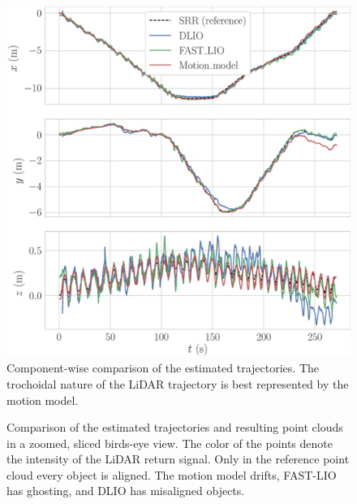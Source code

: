 \begin{figure}
  \centering 
  \includegraphics[width=\linewidth]{img/trajectory_components}
  \caption{Component-wise comparison of the estimated trajectories.
  The trochoidal nature of the LiDAR trajectory is best represented by the motion model.}
  \label{fig:components}
\end{figure}

\begin{figure}
  \centering 
  \hfill \vskip 2mm 
  \hfill
  \caption{Comparison of the estimated trajectories and resulting point clouds in a zoomed, sliced birds-eye view.
  The color of the points denote the intensity of the LiDAR return signal.
  Only in the reference point cloud every object is aligned.
  The motion model drifts, FAST-LIO has ghosting, and DLIO has misaligned objects.}
  \label{fig:pointclouds}
\end{figure}

